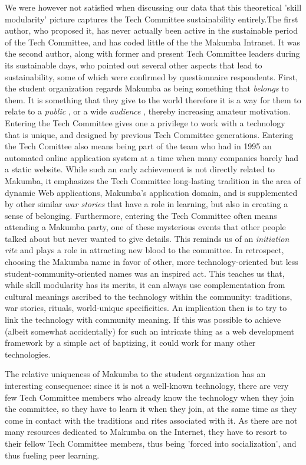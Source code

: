 \documentclass{sig-alt-release2}
\begin{document}
We were however not satisfied when discussing our data that this theoretical 'skill modularity' picture captures the Tech Committee sustainability entirely.The first author, who proposed it, has never actually been active in the sustainable period of the Tech Committee, and has coded little of the the Makumba Intranet. It was the second author, along with former and present Tech Committee leaders during its sustainable days, who pointed out  several other aspects that lead to sustainability, some of which were confirmed by questionnaire respondents. First, the student organization regards Makumba as being something that \textit{belongs} to them. It is something that they give to the world therefore it is a way for them to relate to a \textit{public} \cite{stebbins79}, or a wide \textit{audience} \cite{bogdan03}, thereby increasing amateur motivation. Entering the Tech Committee gives one a privilege to work with a technology that is unique, and designed by previous Tech Committee generations. Entering the Tech Comittee also means being part of the team who had in 1995 an automated online application system at a time when many companies barely had a static website. While such an early achievement is not directly related to Makumba, it emphasizes the Tech Committee long-lasting tradition in the area of dynamic Web applications, Makumba's application domain, and is supplemented by other similar \textit{war stories} \cite{orr96} that have a role in learning, but also in creating a sense of belonging. Furthermore, entering the Tech Committee often means attending a Makumba party, one of these mysterious events that other people talked about but never wanted to give details. This reminds us of an \textit{initiation rite} \cite{vanGennep60} and plays a role in attracting new blood to the committee.
In retrospect, choosing the Makumba name in favor of other, more technology-oriented but less student-community-oriented names was an inspired act. This teaches us that, while skill modularity has its merits, it can always use complementation from cultural meanings ascribed to the technology within the community: traditions, war stories, rituals, world-unique specificities. An implication then is to try to link the technology with community meaning. If this was possible to achieve (albeit somewhat accidentally) for such an intricate thing as a web development framework by a simple act of baptizing, it could work for many other technologies.

The relative uniqueness of Makumba to the student organization has an interesting consequence: since it is not a well-known technology, there are very few Tech Committee members who already know the technology when they join the committee, so they have to learn it when they join, at the same time as they come in contact with the traditions and rites associated with it. As there are not many resources dedicated to Makumba on the Internet, they have to resort to their fellow Tech Committee members, thus being 'forced into socialization', and thus fueling peer learning.
\end{document}
